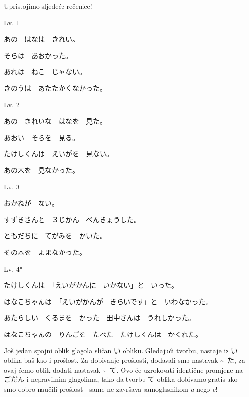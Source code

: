 	
	Upristojimo sljedeće rečenice!
	
	\begin{mondai}{Lv. 1}
		\item あの　はなは　きれい。
		\item そらは　あおかった。
		\item あれは　ねこ　じゃない。
		\item きのうは　あたたかくなかった。
	\end{mondai}

	\begin{mondai}{Lv. 2}
		\item あの　きれいな　はなを　見た。
		\item あおい　そらを　見る。
		\item たけしくんは　えいがを　見ない。
		\item あの木を　見なかった。
	\end{mondai}

	\begin{mondai}{Lv. 3}
		\item おかねが　ない。
		\item すずきさんと　３じかん\footnotemark[1]　べんきょうした。
		\item ともだちに　てがみを　かいた。
		\item その本を　よまなかった。
	\end{mondai}

	\begin{mondai}{Lv. 4*}
		\item たけしくんは　「えいがかんに　いかない」と　いった。
		\item はなこちゃんは　「えいがかんが　きらいです」と　いわなかった。
		\item あたらしい　くるまを　かった　田中さんは　うれしかった。
		\item はなこちゃんの　りんごを　たべた　たけしくんは　かくれた。
	\end{mondai}

\newpage
{}

	
	Još jedan spojni oblik glagola sličan い obliku. Gledajući tvorbu, nastaje iz い oblika baš kao i prošlost. Za dobivanje prošlosti, dodavali smo nastavak \textasciitilde~た, za ovaj ćemo oblik dodati nastavak \textasciitilde~て. Ovo će uzrokovati identične promjene na ごだん i nepravilnim glagolima, tako da tvorbu て oblika dobivamo gratis ako smo dobro naučili prošlost - samo ne završava samoglasnikom \textit{a} nego \textit{e}!
	
